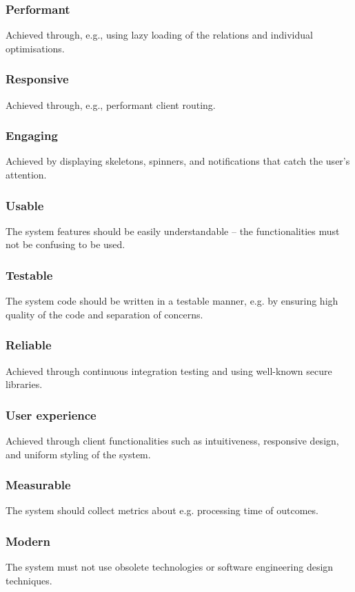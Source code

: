 \documentclass[a4paper,twoside,12pt]{book}
\begin{document}
\subsubsection{Performant}
Achieved through, e.g., using lazy loading of the relations and individual optimisations.

\subsubsection{Responsive}
Achieved through, e.g., performant client routing.

\subsubsection{Engaging}
Achieved by displaying skeletons, spinners, and notifications that catch the user's attention.

\subsubsection{Usable}
The system features should be easily understandable – the functionalities must not be confusing to be used.

\subsubsection{Testable}
The system code should be written in a testable manner, e.g. by ensuring high quality of the code and separation of concerns.

\subsubsection{Reliable}
Achieved through continuous integration testing and using well-known secure libraries.

\subsubsection{User experience}
Achieved through client functionalities such as intuitiveness, responsive design, and uniform styling of the system.

\subsubsection{Measurable} 
The system should collect metrics about e.g. processing time of outcomes.

\subsubsection{Modern}
The system must not use obsolete technologies or software engineering design techniques.
\end{document}
